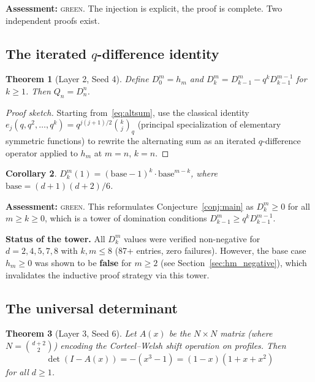 \documentclass[11pt]{article}
\newtheorem{theorem}{Theorem}[section]
\newtheorem{corollary}[theorem]{Corollary}
\theoremstyle{definition}
\begin{document}
\noindent\textbf{Assessment:} \textsc{green}. The injection is explicit, the proof is complete. Two independent proofs exist.

\subsection{The iterated \texorpdfstring{$q$}{q}-difference identity}\label{sec:Dkm}

\begin{theorem}[Layer 2, Seed 4]\label{thm:Dkm}
Define $D_0^m = h_m$ and $D_k^m = D_{k-1}^m - q^k D_{k-1}^{m-1}$ for $k \geq 1$. Then $Q_n = D_n^n$.
\end{theorem}

\begin{proof}[Proof sketch]
Starting from~\eqref{eq:altsum}, use the classical identity $e_j(q, q^2, \ldots, q^k) = q^{j(j+1)/2} \binom{k}{j}_q$ (principal specialization of elementary symmetric functions) to rewrite the alternating sum as an iterated $q$-difference operator applied to $h_m$ at $m = n$, $k = n$.
\end{proof}

\begin{corollary}
$D_k^m(1) = (\text{base} - 1)^k \cdot \text{base}^{m-k}$, where $\text{base} = (d+1)(d+2)/6$.
\end{corollary}

\noindent\textbf{Assessment:} \textsc{green}. This reformulates Conjecture~\ref{conj:main} as $D_k^m \geq 0$ for all $m \geq k \geq 0$, which is a tower of domination conditions $D_{k-1}^m \geq q^k D_{k-1}^{m-1}$.

\medskip\noindent\textbf{Status of the tower.} All $D_k^m$ values were verified non-negative for $d = 2, 4, 5, 7, 8$ with $k, m \leq 8$ (87+ entries, zero failures). However, the base case $h_m \geq 0$ was shown to be \textbf{false} for $m \geq 2$ (see Section~\ref{sec:hm_negative}), which invalidates the inductive proof strategy via this tower.

\subsection{The universal determinant}\label{sec:det}

\begin{theorem}[Layer 3, Seed 6]\label{thm:det}
Let $A(x)$ be the $N \times N$ matrix (where $N = \binom{d+2}{2}$) encoding the Corteel--Welsh shift operation on profiles. Then
\[
\det(I - A(x)) = -(x^3 - 1) = (1 - x)(1 + x + x^2)
\]
for all $d \geq 1$.
\end{theorem}
\end{document}
